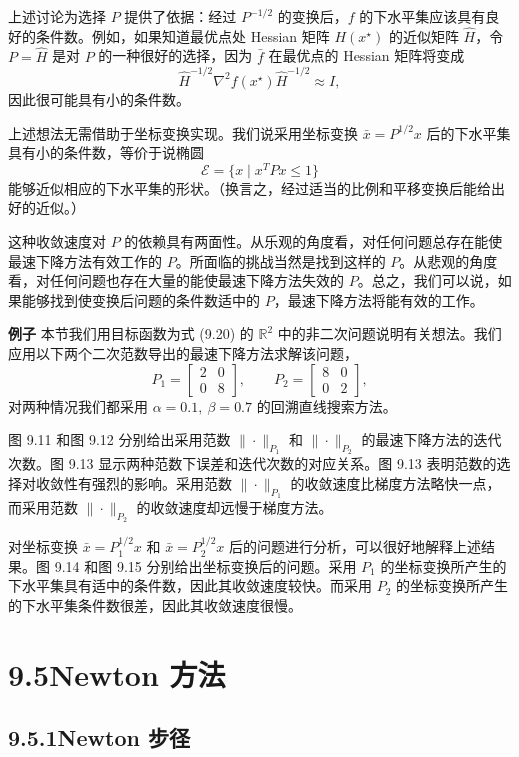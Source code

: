 \documentclass[UTF8, 12pt, fontset=fandol, oneside]{ctexart}
\begin{document}
上述讨论为选择 $P$ 提供了依据：经过 $P^{-1/2}$ 的变换后，$f$ 的下水平集应该具有良好的条件数。例如，如果知道最优点处 Hessian 矩阵 $H(x^\star)$ 的近似矩阵 $\hat{H}$，令 $P=\hat{H}$ 是对 $P$ 的一种很好的选择，因为 $\bar{f}$ 在最优点的 Hessian 矩阵将变成
\[
\hat{H}^{-1/2}\nabla^2 f(x^\star)\hat{H}^{-1/2}\approx I,
\]
因此很可能具有小的条件数。

上述想法无需借助于坐标变换实现。我们说采用坐标变换 $\bar{x}=P^{1/2}x$ 后的下水平集具有小的条件数，等价于说椭圆
\[
\mathcal{E}=\{x\mid x^TPx\leq1\}
\]
能够近似相应的下水平集的形状。（换言之，经过适当的比例和平移变换后能给出好的近似。）

这种收敛速度对 $P$ 的依赖具有两面性。从乐观的角度看，对任何问题总存在能使最速下降方法有效工作的 $P$。所面临的挑战当然是找到这样的 $P$。从悲观的角度看，对任何问题也存在大量的能使最速下降方法失效的 $P$。总之，我们可以说，如果能够找到使变换后问题的条件数适中的 $P$，最速下降方法将能有效的工作。

\noindent\textbf{例子}\quad
本节我们用目标函数为式 (9.20) 的 $\mathbb{R}^2$ 中的非二次问题说明有关想法。我们应用以下两个二次范数导出的最速下降方法求解该问题，
\[
P_1=\begin{bmatrix}2&0\\0&8\end{bmatrix},\qquad
P_2=\begin{bmatrix}8&0\\0&2\end{bmatrix},
\]
对两种情况我们都采用 $\alpha=0.1,\ \beta=0.7$ 的回溯直线搜索方法。

图 9.11 和图 9.12 分别给出采用范数 $\|\cdot\|_{P_1}$ 和 $\|\cdot\|_{P_2}$ 的最速下降方法的迭代次数。图 9.13 显示两种范数下误差和迭代次数的对应关系。图 9.13 表明范数的选择对收敛性有强烈的影响。采用范数 $\|\cdot\|_{P_1}$ 的收敛速度比梯度方法略快一点，而采用范数 $\|\cdot\|_{P_2}$ 的收敛速度却远慢于梯度方法。

对坐标变换 $\bar{x}=P_1^{1/2}x$ 和 $\bar{x}=P_2^{1/2}x$ 后的问题进行分析，可以很好地解释上述结果。图 9.14 和图 9.15 分别给出坐标变换后的问题。采用 $P_1$ 的坐标变换所产生的下水平集具有适中的条件数，因此其收敛速度较快。而采用 $P_2$ 的坐标变换所产生的下水平集条件数很差，因此其收敛速度很慢。

\section*{9.5\quad Newton 方法}

\subsection*{9.5.1\quad Newton 步径}
\end{document}
